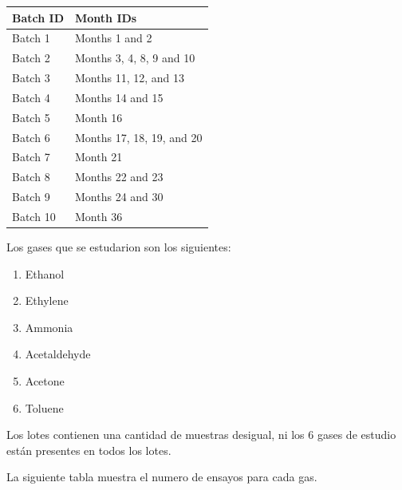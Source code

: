 \begin{table}[]
\begin{tabular}{|l|l|}
\hline
Batch ID & Month IDs                   \\ \hline
Batch 1  & Months 1 and 2              \\
Batch 2  & Months 3, 4, 8, 9 and 10    \\
Batch 3  & Months 11, 12, and 13       \\
Batch 4  & Months 14 and 15            \\
Batch 5  & Month 16                    \\
Batch 6  & Months 17, 18, 19, and 20   \\
Batch 7  & Month 21                    \\
Batch 8  & Months 22 and 23            \\
Batch 9  & Months 24 and 30            \\
Batch 10 & Month 36                    \\
\end{tabular}
\end{table}

Los gases que se estudarion son los siguientes:
\begin{enumerate}
    \item Ethanol
    \item Ethylene
    \item Ammonia
    \item Acetaldehyde
    \item Acetone
    \item Toluene
\end{enumerate}

Los lotes contienen una cantidad de muestras desigual, ni los 6 gases de estudio están presentes en todos los lotes.

La siguiente tabla muestra el numero de ensayos para cada gas.

